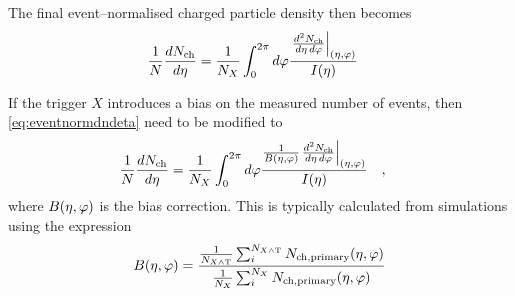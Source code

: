 \documentclass[11pt]{article}
\begin{document}
The final event--normalised charged particle density then becomes 
\begin{align}
  \frac{1}{N}\frac{dN_{\text{ch}}}{d\eta} &= 
  \frac{1}{\N{X}{}} \int_0^{2\pi} d\varphi
  \frac{\dndetadphi[\etaphi]}{I(\eta)}
  \label{eq:eventnormdndeta}
\end{align}

If the trigger $X$ introduces a bias on the measured number of events,
then \eqref{eq:eventnormdndeta} need to be modified to 
\begin{align}
  \frac{1}{N}\frac{dN_{\text{ch}}}{d\eta} &= 
  \frac{1}{\N{X}{}} \int_0^{2\pi} d\varphi
  \frac{\frac{1}{B\etaphi}\dndetadphi[\etaphi]}{I(\eta)}
  \label{eq:eventnormdndeta2}\quad,
\end{align}
where $B\etaphi$ is the bias correction.  This is typically
calculated from simulations using the expression 
\begin{align}
  B\etaphi = \frac{\frac{1}{\N{X\wedge
        \text{T}}{}}\sum_i^{\N{X\wedge \text{T}}{}}
    \mult[,\text{primary}]\etaphi}{\frac{1}{\N{X}{}}\sum_i^{\N{X}{}}
    \mult[,\text{primary}]\etaphi}
\end{align}
\end{document}
